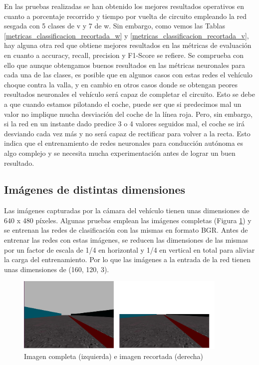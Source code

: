 En las pruebas realizadas se han obtenido los mejores resultados operativos en cuanto a porcentaje recorrido y tiempo por vuelta de circuito empleando la red sesgada con 5 clases de v y 7 de w. Sin embargo, como vemos las Tablas \ref{metricas_classificacion_recortada_w} y \ref{metricas_classificacion_recortada_v}, hay alguna otra red que obtiene mejores resultados en las métricas de evaluación en cuanto a accuracy, recall, precision y F1-Score se refiere. Se comprueba con ello que aunque obtengamos buenos resultados en las métricas neuronales para cada una de las clases, es posible que en algunos casos con estas redes el vehículo choque contra la valla, y en cambio en otros casos donde se obtengan peores resultados neuronales el vehículo será capaz de completar el circuito. Esto se debe a que cuando estamos pilotando el coche, puede ser que si predecimos mal un valor no implique mucha desviación del coche de la línea roja. Pero, sin embargo, si la red en un instante dado predice 3 o 4 valores seguidos mal, el coche se irá desviando cada vez más y no será capaz de rectificar para volver a la recta. Esto indica que el entrenamiento de redes neuronales para conducción autónoma es algo complejo y se necesita mucha experimentación antes de lograr un buen resultado.


\subsection{Imágenes de distintas dimensiones}\label{img_dimension}

Las imágenes capturadas por la cámara del vehículo tienen unas dimensiones de 640 x 480 píxeles. Algunas pruebas emplean las imágenes completas (Figura \ref{fig.imgs_class}) y se entrenan las redes de clasificación con las mismas en formato BGR. Antes de entrenar las redes con estas imágenes, se reducen las dimensiones de las mismas por un factor de escala de 1/4 en horizontal y 1/4 en vertical en total para aliviar la carga del entrenamiento. Por lo que las imágenes a la entrada de la red tienen unas dimensiones de (160, 120, 3).\\

\begin{figure}
\begin{center}
	\includegraphics[width=0.9\textwidth]{figures/Clasificacion/imgs.png}
   \caption{Imagen completa (izquierda) e imagen recortada (derecha)}
	\label{fig.imgs_class}
\end{center}
\end{figure}


